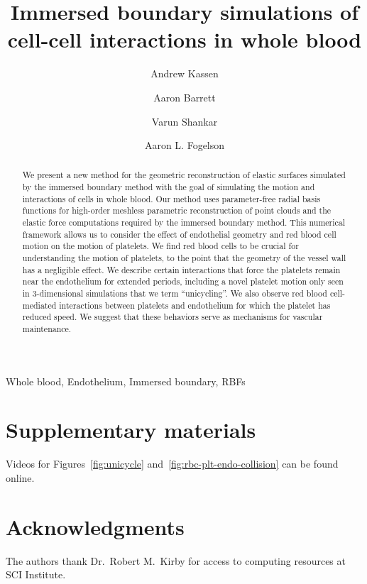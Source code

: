 \documentclass[1p,preprint,fleqn,number,sort&compress,times]{elsarticle}
\begin{document}
\begin{frontmatter}

\title{Immersed boundary simulations of cell-cell interactions in whole blood}

\author[1]{Andrew Kassen}  
\author[1]{Aaron Barrett}               
\author[2]{Varun Shankar}               
\author[1]{Aaron L. Fogelson}  

\address[1]{Department of Mathematics, University of Utah, Salt Lake City, UT 84112, USA}
\address[2]{School of Computing, University of Utah, Salt Lake City, UT 84112, USA}
\address[3]{Department of Bioengineering, University of Utah, Salt Lake City, UT 84112, USA}


\begin{abstract}
We present a new method for the geometric reconstruction of elastic surfaces simulated by the immersed boundary method with the goal of simulating the motion and interactions of cells in whole blood. Our method uses parameter-free radial basis functions for high-order meshless parametric reconstruction of point clouds and the elastic force computations required by the immersed boundary method. This numerical framework allows us to consider the effect of endothelial geometry and red blood cell motion on the motion of platelets. We find red blood cells to be crucial for understanding the motion of platelets, to the point that the geometry of the vessel wall has a negligible effect. We describe certain interactions that force the platelets remain near the endothelium for extended periods, including a novel platelet motion only seen in 3-dimensional simulations that we term ``unicycling''. We also observe red blood cell-mediated interactions between platelets and endothelium for which the platelet has reduced speed. We suggest that these behaviors serve as mechanisms for vascular maintenance.
\end{abstract}

\begin{keyword}
    Whole blood,
    Endothelium,
    Immersed boundary,
    RBFs
\end{keyword}

\end{frontmatter}





\appendix
\makeatletter
\gdef\thesubsection{\@Alph\c@section.\the\value{subsection}}%
\makeatother
\renewcommand\thefigure{\arabic{figure}}



\section{Supplementary materials}\label{sec:supp}
Videos for Figures~\ref{fig:unicycle} and~\ref{fig:rbc-plt-endo-collision} can be found
online.

\section*{Acknowledgments}
The authors thank Dr.\ Robert M.\ Kirby for access to computing resources at SCI
Institute.


\end{document}
